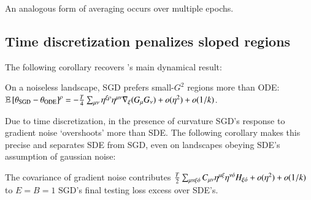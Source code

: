             An analogous form of averaging occurs over multiple epochs.  
 
        \subsection{Time discretization penalizes sloped regions}
            The following corollary recovers \cite{ba21}'s main dynamical
            result: 
            \begin{cor}[$\sdia{c(0-1-2)(01-12)}$] \label{cor:epochs}
                On a noiseless landscape, SGD prefers small-$G^2$ regions
                more than ODE: 
                $
                    \mathbb{E}\left[\theta_{\text{SGD}} - \theta_{\text{ODE}}\right]^\rho
                        =
                    -\frac{T}{4}
                    \sum_{\mu\nu} \eta^{\xi\rho} \eta^{\mu\nu} \nabla_\xi(G_\mu G_\nu)
                    + o(\eta^2) + o(1/k) 
                $.
            \end{cor}
            Due to time discretization, in the presence of curvature SGD's
            response to gradient noise `overshoots' more than SDE.  The
            following corollary makes this precise and separates SDE from SGD,
            even on landscapes obeying SDE's assumption of gaussian noise:
            \begin{cor}[$\sdia{c(01-2)(02-12)}$] \label{cor:vsode}
                The covariance of gradient noise contributes  
                $
                    \frac{T}{2} \sum_{\mu\nu\xi{\acute{o}}} C_{\mu\nu} \eta^{\mu\xi}\eta^{\nu{\acute{o}}}
                    H_{\xi{\acute{o}}} + o(\eta^2) + o(1/k) 
                $  
                to $E=B=1$ SGD's final testing loss excess over SDE's.
            \end{cor}

